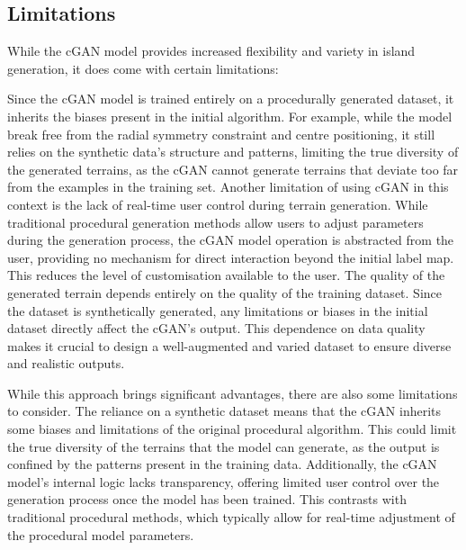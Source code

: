 \subsection{Limitations}
\label{sec:coral-island-limitations}

While the cGAN model provides increased flexibility and variety in island generation, it does come with certain limitations:

\begin{Itemize}
 Since the cGAN model is trained entirely on a procedurally generated dataset, it inherits the biases present in the initial algorithm. For example, while the model break free from the radial symmetry constraint and centre positioning, it still relies on the synthetic data's structure and patterns, limiting the true diversity of the generated terrains, as the cGAN cannot generate terrains that deviate too far from the examples in the training set.
 Another limitation of using cGAN in this context is the lack of real-time user control during terrain generation. While traditional procedural generation methods allow users to adjust parameters during the generation process, the cGAN model operation is abstracted from the user, providing no mechanism for direct interaction beyond the initial label map. This reduces the level of customisation available to the user.
 The quality of the generated terrain depends entirely on the quality of the training dataset. Since the dataset is synthetically generated, any limitations or biases in the initial dataset directly affect the cGAN's output. This dependence on data quality makes it crucial to design a well-augmented and varied dataset to ensure diverse and realistic outputs.
\end{Itemize}

While this approach brings significant advantages, there are also some limitations to consider. The reliance on a synthetic dataset means that the cGAN inherits some biases and limitations of the original procedural algorithm. This could limit the true diversity of the terrains that the model can generate, as the output is confined by the patterns present in the training data. Additionally, the cGAN model's internal logic lacks transparency, offering limited user control over the generation process once the model has been trained. This contrasts with traditional procedural methods, which typically allow for real-time adjustment of the procedural model parameters.

